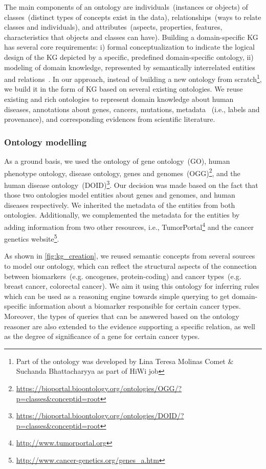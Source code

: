 \hspace*{3.5mm} The main components of an ontology are individuals~(instances or objects) of classes~(distinct types of concepts exist in the data), relationships~(ways to relate classes and individuals), and attributes~(aspects, properties, features, characteristics that objects and classes can have). Building a domain-specific KG has several core requirements: i) formal conceptualization to indicate the logical design of the KG depicted by a specific, predefined domain-specific ontology, ii) modeling of domain knowledge, represented by semantically interrelated entities and relations~\cite{abu2020domain}. %
In our approach, instead of building a new ontology from scratch\footnote{Part of the ontology was developed by Lina Teresa Molinas Comet \& Suchanda Bhattacharyya as part of HiWi job}, we build it in the form of KG based on several existing ontologies. We reuse existing and rich ontologies to represent domain knowledge about human diseases, annotations about genes, cancers, mutations, metadata ~(i.e., labels and provenance), and corresponding evidences from scientific literature. 

\subsubsection{Ontology modelling}
As a ground basis, we used the ontology of gene ontology~(GO), human phenotype ontology, disease ontology, genes and genomes~(OGG)\footnote{\url{https://bioportal.bioontology.org/ontologies/OGG/?p=classes&conceptid=root}}, and the human disease ontology~(DOID)\footnote{\url{https://bioportal.bioontology.org/ontologies/DOID/?p=classes&conceptid=root}}. Our decision was made based on the fact that those two ontologies model entities about genes and genomes, and human diseases respectively. We inherited the metadata of the entities from both ontologies. Additionally, we complemented the metadata for the entities by adding information from two other resources, i.e., TumorPortal\footnote{\url{http://www.tumorportal.org}} and the cancer genetics website\footnote{\url{http://www.cancer-genetics.org/genes_a.htm}}. 

\hspace*{3.5mm} As shown in \cref{fig:kg_creation}, we reused semantic concepts from several sources to model our ontology, which can reflect the structural aspects of the connection between biomarkers~(e.g. oncogenes, protein-coding) and cancer types~(e.g. breast cancer, colorectal cancer). We aim it using this ontology for inferring rules which can be used as a reasoning engine towards simple querying to get domain-specific information about a biomarker responsible for certain cancer types. Moreover, the types of queries that can be answered based on the ontology reasoner are also extended to the evidence supporting a specific relation, as well as the degree of significance of a gene for certain cancer types. 

